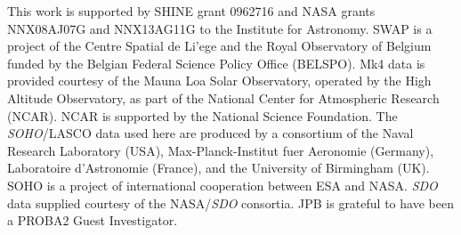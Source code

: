 \documentclass[namedreferences]{solarphysics}
\begin{document}
\begin{article}




%



%
  

%



%
 \begin{acks}
 
This work is supported by SHINE grant 0962716 and NASA grants NNX08AJ07G and NNX13AG11G to the Institute for Astronomy.
SWAP is a project of the Centre Spatial de Li'ege and the Royal Observatory of Belgium funded by the Belgian Federal Science Policy Office (BELSPO).
Mk4 data is provided courtesy of the Mauna Loa Solar Observatory, operated by the High Altitude Observatory, as part of the National Center for Atmospheric Research (NCAR). NCAR is supported by the National Science Foundation.
The \emph{SOHO}/LASCO data used here are produced by a consortium of the Naval Research Laboratory (USA), Max-Planck-Institut fuer Aeronomie (Germany), Laboratoire d'Astronomie (France), and the University of Birmingham (UK). SOHO is a project of international cooperation between ESA and NASA.
\emph{SDO} data supplied courtesy of the NASA/\emph{SDO} consortia. JPB is grateful to have been a PROBA2 Guest Investigator.

 \end{acks}


%
%
 
   
%
%
%   
%  

\end{article} 
\end{document}
